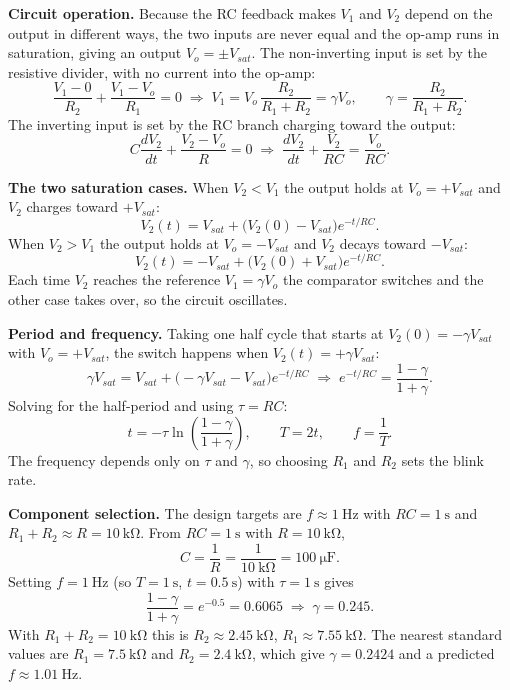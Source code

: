 \documentclass[11pt]{article}
\begin{document}
\textbf{Circuit operation.}
Because the RC feedback makes $V_1$ and $V_2$ depend on the output in different
ways, the two inputs are never equal and the op-amp runs in saturation, giving an
output $V_o = \pm V_{sat}$. The non-inverting input is set by the resistive
divider, with no current into the op-amp:
\[
    \frac{V_1-0}{R_2}+\frac{V_1-V_o}{R_1}=0
    \;\Rightarrow\;
    V_1 = V_o\,\frac{R_2}{R_1+R_2} = \gamma V_o,
    \qquad
    \gamma = \frac{R_2}{R_1+R_2}.
\]
The inverting input is set by the RC branch charging toward the output:
\[
    C\frac{dV_2}{dt}+\frac{V_2-V_o}{R}=0
    \;\Rightarrow\;
    \frac{dV_2}{dt}+\frac{V_2}{RC}=\frac{V_o}{RC}.
\]

\textbf{The two saturation cases.}
When $V_2<V_1$ the output holds at $V_o=+V_{sat}$ and $V_2$ charges toward
$+V_{sat}$:
\[
    V_2(t)=V_{sat}+\bigl(V_2(0)-V_{sat}\bigr)e^{-t/RC}.
\]
When $V_2>V_1$ the output holds at $V_o=-V_{sat}$ and $V_2$ decays toward
$-V_{sat}$:
\[
    V_2(t)=-V_{sat}+\bigl(V_2(0)+V_{sat}\bigr)e^{-t/RC}.
\]
Each time $V_2$ reaches the reference $V_1=\gamma V_o$ the comparator switches and
the other case takes over, so the circuit oscillates.

\textbf{Period and frequency.}
Taking one half cycle that starts at $V_2(0)=-\gamma V_{sat}$ with $V_o=+V_{sat}$,
the switch happens when $V_2(t)=+\gamma V_{sat}$:
\[
    \gamma V_{sat}=V_{sat}+\bigl(-\gamma V_{sat}-V_{sat}\bigr)e^{-t/RC}
    \;\Rightarrow\;
    e^{-t/RC}=\frac{1-\gamma}{1+\gamma}.
\]
Solving for the half-period and using $\tau=RC$:
\[
    t=-\tau\ln\!\left(\frac{1-\gamma}{1+\gamma}\right),
    \qquad
    T=2t,
    \qquad
    f=\frac{1}{T}.
\]
The frequency depends only on $\tau$ and $\gamma$, so choosing $R_1$ and $R_2$
sets the blink rate.

\textbf{Component selection.}
The design targets are $f\approx\SI{1}{\hertz}$ with $RC=\SI{1}{\second}$ and
$R_1+R_2\approx R=\SI{10}{\kilo\ohm}$. From $RC=\SI{1}{\second}$ with
$R=\SI{10}{\kilo\ohm}$,
\[
    C=\frac{1}{R}=\frac{1}{\SI{10}{\kilo\ohm}}=\SI{100}{\micro\farad}.
\]
Setting $f=\SI{1}{\hertz}$ (so $T=\SI{1}{\second}$, $t=\SI{0.5}{\second}$) with
$\tau=\SI{1}{\second}$ gives
\[
    \frac{1-\gamma}{1+\gamma}=e^{-0.5}=0.6065
    \;\Rightarrow\;
    \gamma=0.245.
\]
With $R_1+R_2=\SI{10}{\kilo\ohm}$ this is $R_2\approx\SI{2.45}{\kilo\ohm}$,
$R_1\approx\SI{7.55}{\kilo\ohm}$. The nearest standard values are
$R_1=\SI{7.5}{\kilo\ohm}$ and $R_2=\SI{2.4}{\kilo\ohm}$, which give
$\gamma=0.2424$ and a predicted $f\approx\SI{1.01}{\hertz}$.
\end{document}
